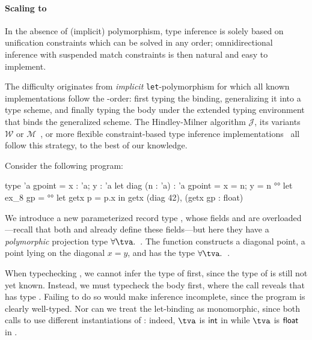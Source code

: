 \documentclass[acmsmall,screen,nonacm%
\Anonymous{,anonymous}{}%
\Final{}{,review}%
]{acmart}
\newcommand{\BBemlti}{Pottier-Remy/emlti}
\begin{document}
\paragraph{Scaling to \ML}


In the absence of (implicit) polymorphism, type inference is solely based on
unification constraints which can be solved in any order; omnidirectional
inference with suspended match constraints is then natural and easy to
implement.


The difficulty originates from \ML \emph{implicit} \texttt{let}-polymorphism for which
all known implementations follow the \geninst-order: first typing the binding,
generalizing it into a type scheme, and finally typing the body under the
extended typing environment that binds the generalized scheme. The
Hindley-Milner algorithm $\mathcal{J}$, its variants $\mathcal{W}$ or
$\mathcal{M}$~\citep* {Lee_Yi/algoM@toplas1998}, or more flexible
constraint-based type inference implementations~\citep*
{Remy/mleth,Remy/thesis, Odersky-Sulzmann-Wehr@tpos, \BBemlti} all
follow this strategy, to the best of our knowledge.


Consider the following program:
\begin{program}[input]
type 'a gpoint = { x : 'a; y : 'a }                     
let diag (n : 'a) : 'a gpoint = { x = n; y = n }
°\halfline°
let ex_8 gp =                                           °°
  let getx p = p.x in getx (diag 42), (getx gp : float)
\end{program}
We introduce a new parameterized record type , whose
fields  and  are overloaded---recall that both  and
 already define these fields---but here they have a
\emph{polymorphic} projection type $\tfor \tv {}$ . The
function  constructs a diagonal point, a point lying on the
diagonal $x = y$, and has the type $\tfor \tv {}$ .

When typechecking , we cannot infer the type of  first,
since the type of  is still not yet known. Instead, we must typecheck
the body first, where the call  reveals that  has
type .
%
Failing to do so would make inference incomplete, since the program is
clearly well-typed. Nor can we treat the let-binding as monomorphic, since
both calls to  use different instantiations of : indeed,
$\tv$ is $\mathsf{int}$ in  while $\tv$ is $\mathsf{float}$ in
.
\end{document}
